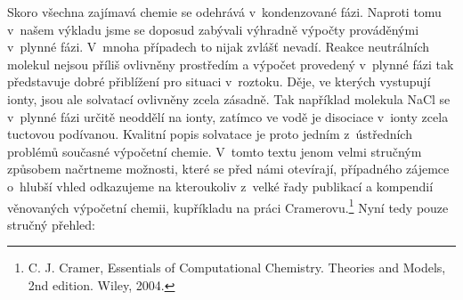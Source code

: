 Skoro všechna zajímavá chemie se odehrává v~kondenzované fázi. Naproti tomu v~našem výkladu jsme se doposud zabývali výhradně výpočty prováděnými v~plynné fázi. V~mnoha případech to nijak zvlášť nevadí. Reakce neutrálních molekul nejsou příliš ovlivněny prostředím a výpočet provedený v~plynné fázi tak představuje dobré přiblížení pro situaci v~roztoku.
Děje, ve kterých vystupují ionty, jsou ale solvatací ovlivněny zcela zásadně. Tak například molekula NaCl se v~plynné fázi určitě neoddělí na ionty, zatímco ve vodě je disociace v~ionty zcela tuctovou podívanou.
Kvalitní popis solvatace je proto jedním z~ústředních problémů současné výpočetní chemie. V~tomto textu jenom velmi stručným způsobem načrtneme možnosti, které se před námi otevírají, případného zájemce o~hlubší vhled odkazujeme na kteroukoliv z~velké řady publikací a kompendií věnovaných výpočetní chemii, kupříkladu na práci Cramerovu.\footnote{C. J. Cramer, Essentials of Computational Chemistry. Theories and Models, 2nd edition. Wiley, 2004.} Nyní tedy pouze stručný přehled:

